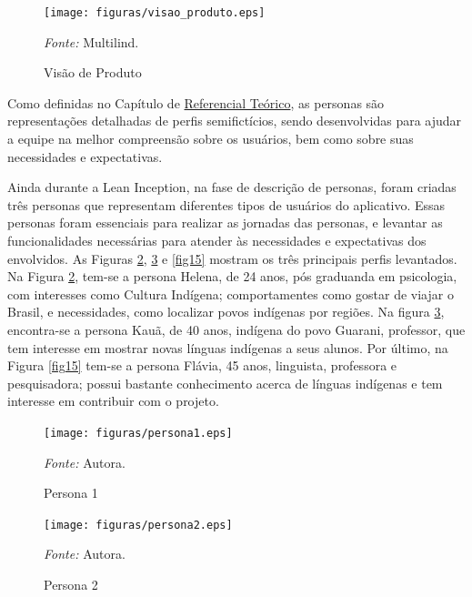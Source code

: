\begin{figure}[h!]
	\centering
	\caption{Visão de Produto}
	\begin{adjustbox}{center}
		\texttt{[image: figuras/visao\_produto.eps]}
	\end{adjustbox}
	\begin{tablenotes}[flushleft]
		\centering
		\item \textit{Fonte:} Multilind.
	\end{tablenotes}
	\label{fig11}
\end{figure}

Como definidas no Capítulo de \hyperref[chap:Referencial]{Referencial Teórico}, as personas são representações detalhadas de perfis semifictícios, sendo desenvolvidas para ajudar a equipe na melhor compreensão sobre os usuários, bem 
como sobre suas necessidades e expectativas. 

Ainda durante a Lean Inception, na fase de descrição de personas, foram criadas três personas que representam diferentes tipos de usuários do aplicativo. Essas personas foram essenciais para realizar as jornadas das personas, e levantar as 
funcionalidades necessárias para atender às necessidades e expectativas dos envolvidos. As Figuras \ref{fig13}, \ref{fig14} e \ref{fig15} mostram os três principais perfis levantados.  Na Figura \ref{fig13}, tem-se a persona Helena, de 24 anos, pós 
graduanda em psicologia, com interesses como Cultura Indígena; comportamentes como gostar de viajar o Brasil, e necessidades, como localizar povos indígenas por regiões. Na figura \ref{fig14}, encontra-se a persona Kauã, de 40 anos, indígena do povo 
Guarani, professor, que tem interesse em mostrar novas línguas indígenas a seus alunos. Por último, na Figura \ref{fig15} tem-se a persona Flávia, 45 anos, linguista, professora e pesquisadora; possui bastante conhecimento acerca de línguas indígenas e 
tem interesse em contribuir com o projeto.

\begin{figure}[h!]
	\centering
	\caption{Persona 1}
	\begin{adjustbox}{center}
		\texttt{[image: figuras/persona1.eps]}
	\end{adjustbox}
	\begin{tablenotes}[flushleft]
		\centering
		\item \textit{Fonte:} Autora.
	\end{tablenotes}
	\label{fig13}
\end{figure}

\begin{figure}[h!]
	\centering
	\caption{Persona 2}
	\begin{adjustbox}{center}
		\texttt{[image: figuras/persona2.eps]}
	\end{adjustbox}
	\begin{tablenotes}[flushleft]
		\centering
		\item \textit{Fonte:} Autora.
	\end{tablenotes}
	\label{fig14}
\end{figure}

